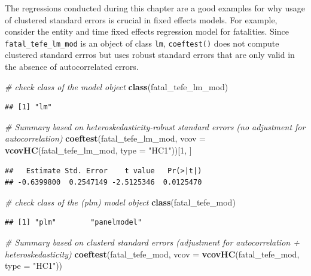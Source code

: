 \documentclass[]{book}
\newenvironment{Shaded}{\begin{snugshade}}{\end{snugshade}}
\newcommand{\KeywordTok}[1]{\textcolor[rgb]{0.13,0.29,0.53}{\textbf{#1}}}
\newcommand{\DataTypeTok}[1]{\textcolor[rgb]{0.13,0.29,0.53}{#1}}
\newcommand{\DecValTok}[1]{\textcolor[rgb]{0.00,0.00,0.81}{#1}}
\newcommand{\StringTok}[1]{\textcolor[rgb]{0.31,0.60,0.02}{#1}}
\newcommand{\CommentTok}[1]{\textcolor[rgb]{0.56,0.35,0.01}{\textit{#1}}}
\newcommand{\NormalTok}[1]{#1}
\theoremstyle{definition}
\theoremstyle{definition}
\theoremstyle{definition}
\theoremstyle{remark}
\begin{document}
The regressions conducted during this chapter are a good examples for
why usage of clustered standard errors is crucial in fixed effects
models. For example, consider the entity and time fixed effects
regression model for fatalities. Since \texttt{fatal\_tefe\_lm\_mod} is
an object of class \texttt{lm}, \texttt{coeftest()} does not compute
clustered standard errros but uses robust standard errors that are only
valid in the absence of autocorrelated errors.

\begin{Shaded}
\begin{Highlighting}[]
\CommentTok{# check class of the model object}
\KeywordTok{class}\NormalTok{(fatal_tefe_lm_mod)}
\end{Highlighting}
\end{Shaded}

\begin{verbatim}
## [1] "lm"
\end{verbatim}

\begin{Shaded}
\begin{Highlighting}[]
\CommentTok{# Summary based on heteroskedasticity-robust standard errors (no adjustment for autocorrelation)}
\KeywordTok{coeftest}\NormalTok{(fatal_tefe_lm_mod, }\DataTypeTok{vcov =} \KeywordTok{vcovHC}\NormalTok{(fatal_tefe_lm_mod, }\DataTypeTok{type =} \StringTok{"HC1"}\NormalTok{))[}\DecValTok{1}\NormalTok{, ]}
\end{Highlighting}
\end{Shaded}

\begin{verbatim}
##   Estimate Std. Error    t value   Pr(>|t|) 
## -0.6399800  0.2547149 -2.5125346  0.0125470
\end{verbatim}

\begin{Shaded}
\begin{Highlighting}[]
\CommentTok{# check class of the (plm) model object}
\KeywordTok{class}\NormalTok{(fatal_tefe_mod)}
\end{Highlighting}
\end{Shaded}

\begin{verbatim}
## [1] "plm"        "panelmodel"
\end{verbatim}

\begin{Shaded}
\begin{Highlighting}[]
\CommentTok{# Summary based on clusterd standard errors (adjustment for autocorrelation + heteroskedasticity)}
\KeywordTok{coeftest}\NormalTok{(fatal_tefe_mod, }\DataTypeTok{vcov =} \KeywordTok{vcovHC}\NormalTok{(fatal_tefe_mod, }\DataTypeTok{type =} \StringTok{"HC1"}\NormalTok{))}
\end{Highlighting}
\end{Shaded}
\end{document}
